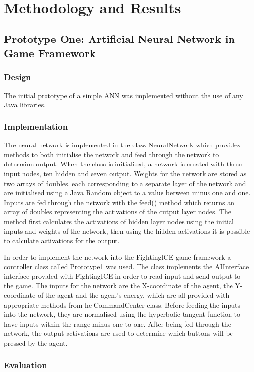 \documentclass[11pt,a4paper]{article}
\begin{document}
\section{Methodology and Results}
\subsection{Prototype One: Artificial Neural Network in Game Framework}
\subsubsection{Design}
The initial prototype of a simple ANN was implemented without the use of any Java libraries.
\subsubsection{Implementation}
The neural network is implemented in the class NeuralNetwork which provides methods to both initialise the network and feed through the network to determine output. When the class is initialised, a network is created with three input nodes, ten hidden and seven output. Weights for the network are stored as two arrays of doubles, each corresponding to a separate layer of the network and are initialised using a Java Random object to a value between minus one and one. Inputs are fed through the network with the feed() method which returns an array of doubles representing the activations of the output layer nodes. The method first calculates the activations of hidden layer nodes using the initial inputs and weights of the network, then using the hidden activations it is possible to calculate activations for the output.

In order to implement the network into the FightingICE game framework a controller class called Prototype1 was used. The class implements the AIInterface interface provided with FightingICE in order to read input and send output to the game. The inputs for the network are the X-coordinate of the agent, the Y-coordinate of the agent and the agent's energy, which are all provided with appropriate methods from he CommandCenter class. Before feeding the inputs into the network, they are normalised using the hyperbolic tangent function to have inputs within the range minus one to one. After being fed through the network, the output activations are used to determine which buttons will be pressed by the agent. 
\subsubsection{Evaluation}
\end{document}
